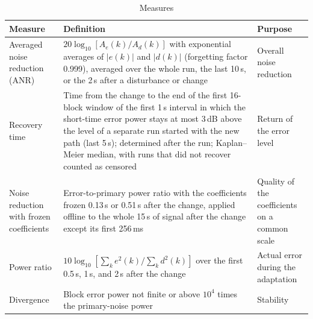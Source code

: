 \begin{table}[tbp]
\centering
\small
\caption{Measures}
\label{tab:atsip-11}
\begin{tabular}{>{\raggedright\arraybackslash}p{}>{\raggedright\arraybackslash}p{}>{\raggedright\arraybackslash}p{}}
\toprule
Measure & Definition & Purpose \\
\midrule
Averaged noise reduction (ANR) \cite{akhtar2009} & $20\log_{10}[A_e(k)/A_d(k)]$ with exponential averages of $|e(k)|$ and $|d(k)|$ (forgetting factor 0.999), averaged over the whole run, the last 10\,s, or the 2\,s after a disturbance or change & Overall noise reduction \\
Recovery time & Time from the change to the end of the first 16-block window of the first 1\,s interval in which the short-time error power stays at most 3\,dB above the level of a separate run started with the new path (last 5\,s); determined after the run; Kaplan--Meier median, with runs that did not recover counted as censored & Return of the error level \\
Noise reduction with frozen coefficients & Error-to-primary power ratio with the coefficients frozen 0.13\,s or 0.51\,s after the change, applied offline to the whole 15\,s of signal after the change except its first 256\,ms & Quality of the coefficients on a common scale \\
Power ratio & $10\log_{10}[\sum_k e^2(k)/\sum_k d^2(k)]$ over the first 0.5\,s, 1\,s, and 2\,s after the change & Actual error during the adaptation \\
Divergence & Block error power not finite or above $10^4$ times the primary-noise power & Stability \\
\bottomrule
\end{tabular}
\end{table}
